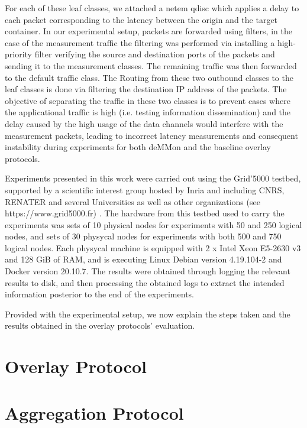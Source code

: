For each of these leaf classes, we attached a netem qdisc which applies a delay to each packet corresponding to the latency between the origin and the target container. In our experimental setup, packets are forwarded using filters, in the case of the measurement traffic the filtering was performed via installing a high-priority filter verifying the source and destination ports of the packets and sending it to the measurement classes. The remaining traffic was then forwarded to the default traffic class. The Routing from these two outbound classes to the leaf classes is done via filtering the destination IP address of the packets.  The objective of separating the traffic in these two classes is to prevent cases where the applicational traffic is high (i.e. testing information dissemination) and the delay caused by the high usage of the data channels would interfere with the measurement packets, leading to incorrect latency measurements and consequent instability during experiments for both deMMon and the baseline overlay protocols. 

Experiments presented in this work were carried out using the Grid'5000 testbed, supported by a scientific interest group hosted by Inria and including CNRS, RENATER and several Universities as well as other organizations (see https://www.grid5000.fr) . The hardware from this testbed used to carry the experiments was sets of 10 physical nodes for experiments with 50 and 250 logical nodes, and sets of 30 physycal nodes for experiments with both 500 and 750 logical nodes. Each physycal machine is equipped with 2 x Intel Xeon E5-2630 v3 and 128 GiB of RAM, and is executing Linux Debian version 4.19.104-2 and Docker version 20.10.7. The results were obtained through logging the relevant results to disk, and then processing the obtained logs to extract the intended information posterior to the end of the experiments.

Provided with the experimental setup, we now explain the steps taken and the results obtained in the overlay protocols' evaluation.

\section{Overlay Protocol} \label{sec:overlay_proto_eval} 

\section{Aggregation Protocol} \label{sec:agg_proto_eval} 

